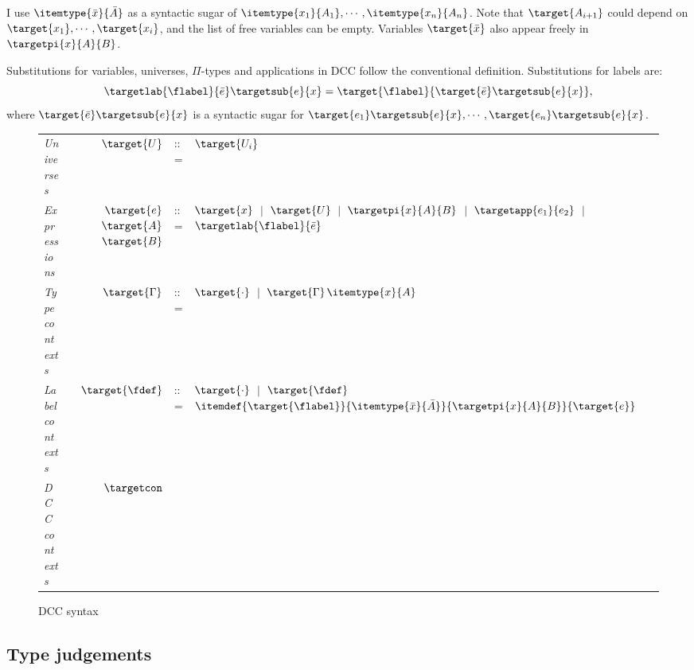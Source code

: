 I use $\itemtype{\bar{x}}{\bar{A}}$ as a syntactic sugar of $\itemtype{x_1}{A_1}, \cdots, \itemtype{x_n}{A_n}$. 
Note that $\target{A_{i+1}}$ could depend on $\target{x_1}, \cdots, \target{x_i}$, and the list of free variables can be empty. Variables $\target{\bar{x}}$ also appear freely in $\targetpi{x}{A}{B}$. 

Substitutions for variables, universes, $\Pi$-types and applications in DCC follow the conventional definition. Substitutions for labels are:
\begin{equation*}
\targetlab{\flabel}{\bar{e}}\targetsub{e}{x} = \target{\flabel}\{\target{\bar{e}}\targetsub{e}{x}\},
\end{equation*}
where $\target{\bar{e}}\targetsub{e}{x}$ is a syntactic sugar for $\target{e_1}\targetsub{e}{x}, \cdots, \target{e_n}\targetsub{e}{x}$.

\begin{figure}[H]
	\renewcommand{\arraystretch}{1.3}
	\begin{tabular}{l r l l}
		\textit{Universes}   & $\target{U} $       & ::= & $\target{U_i}$ \\
		\textit{Expressions} & $\target{e}$\sfcomma $\target{A}$\sfcomma $\target{B}$  & ::= & 
			$\target{x}$ $\ |\ $ $\target{U}$ $\ |\ $ $\targetpi{x}{A}{B}$ $\ |\ $ $\targetapp{e_1}{e_2}$ $\ |\ $ $\targetlab{\flabel}{\bar{e}}$\\
		\textit{Type contexts} & $\target{\Gamma}$ & ::= & $\target{\cdot}$ $\ |\ $ $\target{\Gamma}$\sfcomma $\itemtype{x}{A}$ \\
		\textit{Label contexts} & $\target{\fdef}$ & ::= & $\target{\cdot}$ $\ |\ $ 
			$\target{\fdef}$\sfcomma $\itemdef{\target{\flabel}}{\itemtype{\bar{x}}{\bar{A}}}{\targetpi{x}{A}{B}}{\target{e}}$\\
		\textit{DCC contexts} &$\targetcon$
	\end{tabular}

	\caption{DCC syntax}
    \label{fig:dcc syntax}
\end{figure}

\subsection{Type judgements}

